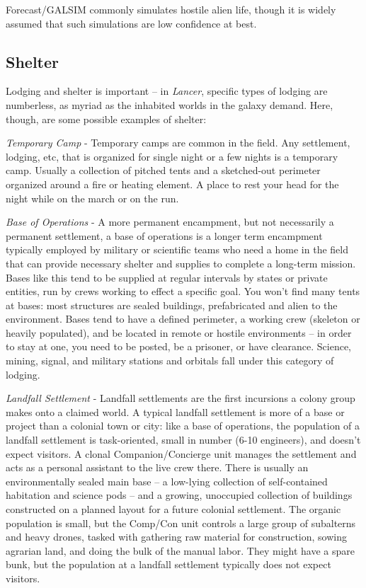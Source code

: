 Forecast/GALSIM commonly simulates hostile alien life, though it is widely assumed that such
simulations are low confidence at best.

\subsection{Shelter}
Lodging and shelter is important -- in \textit{Lancer}, specific types of lodging are numberless, as myriad
as the inhabited worlds in the galaxy demand. Here, though, are some possible examples of
shelter:

\textit{Temporary Camp} - Temporary camps are common in the field. Any settlement, lodging, etc, that
is organized for single night or a few nights is a temporary camp. Usually a collection of pitched
tents and a sketched-out perimeter organized around a fire or heating element. A place to rest
your head for the night while on the march or on the run.

\textit{Base of Operations} - A more permanent encampment, but not necessarily a permanent
settlement, a base of operations is a longer term encampment typically employed by military or
scientific teams who need a home in the field that can provide necessary shelter and supplies to
complete a long-term mission. Bases like this tend to be supplied at regular intervals by states or
private entities, run by crews working to effect a specific goal. You won't find many tents at
bases: most structures are sealed buildings, prefabricated and alien to the environment. Bases
tend to have a defined perimeter, a working crew (skeleton or heavily populated), and be located
in remote or hostile environments -- in order to stay at one, you need to be posted, be a prisoner,
or have clearance. Science, mining, signal, and military stations and orbitals fall under this
category of lodging.

\textit{Landfall Settlement} - Landfall settlements are the first incursions a colony group makes onto a
claimed world. A typical landfall settlement is more of a base or project than a colonial town or
city: like a base of operations, the population of a landfall settlement is task-oriented, small in
number (6-10 engineers), and doesn't expect visitors. A clonal Companion/Concierge unit
manages the settlement and acts as a personal assistant to the live crew there. There is usually
an environmentally sealed main base -- a low-lying collection of self-contained habitation and
science pods -- and a growing, unoccupied collection of buildings constructed on a planned
layout for a future colonial settlement. The organic population is small, but the Comp/Con unit
controls a large group of subalterns and heavy drones, tasked with gathering raw material for
construction, sowing agrarian land, and doing the bulk of the manual labor. They might have a
spare bunk, but the population at a landfall settlement typically does not expect visitors.

